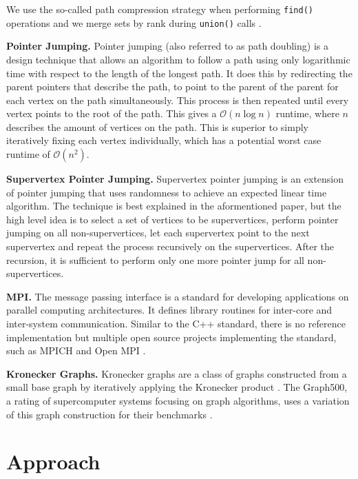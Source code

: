 \documentclass[letterpaper]{article}
\newcommand{\bigoh}{\mathcal O}
\newcommand{\mypar}[1]{{\bf #1.}}
\begin{document}
We use the so-called path compression strategy when performing \verb|find()| operations and we merge sets by rank during
\verb|union()| calls \cite{intro_to_algos}.

\mypar{Pointer Jumping}
Pointer jumping \cite{jeje1992introduction} (also referred to as path doubling) is a design technique that allows an
algorithm to follow a path using only logarithmic time with respect to the length of the longest path. It does this by
redirecting the parent pointers that describe the path, to point to the parent of the parent for each vertex on the path
simultaneously. This process is then repeated until every vertex points to the root of the path. This gives a $\bigoh(n
\log n)$ runtime, where $n$ describes the amount of vertices on the path. This is superior to simply iteratively fixing
each vertex individually, which has a potential worst case runtime of $\bigoh(n^2)$.

\mypar{Supervertex Pointer Jumping}
Supervertex pointer jumping \cite{chung1996parallel} is an extension of pointer jumping that uses randomness to achieve
an expected linear time algorithm. The technique is best explained in the aformentioned paper, but the high level idea
is to select a set of vertices to be supervertices, perform pointer jumping on all non-supervertices, let each
supervertex point to the next supervertex and repeat the process recursively on the supervertices. After the recursion,
it is sufficient to perform only one more pointer jump for all non-supervertices.

\mypar{MPI}
The message passing interface \cite{clarke1994mpi} is a standard for developing applications on parallel computing
architectures. It defines library routines for inter-core and inter-system communication. Similar to the
C++ standard, there is no reference implementation but multiple open source projects implementing the standard, such as
MPICH and Open MPI \cite{gabriel2004open}.

\mypar{Kronecker Graphs}
Kronecker graphs are a class of graphs constructed from a small base graph by iteratively applying the Kronecker product
\cite{leskovec2010kronecker}. The Graph500, a rating of supercomputer systems focusing on graph algorithms, uses a
variation of this graph construction for their benchmarks \cite{graph500}.

\section{Approach}
\label{sec:approach}
\end{document}
